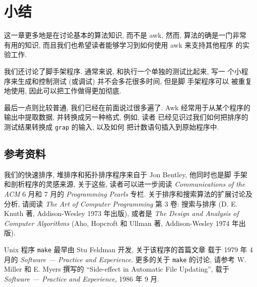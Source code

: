 \section{小结}
\label{sec:experiments_with_algorithms_summary}

这一章更多地是在讨论基本的算法知识, 而不是 awk, 然而, 算法的确是一门非常
有用的知识, 而且我们也希望读者能够学习到如何使用 awk 来支持其他程序
的实验工作.

我们还讨论了脚手架程序. 通常来说, 和执行一个单独的测试比起来, 写一 
个小程序来生成和控制测试 (或调试) 并不会多花很多时间, 但是脚 
手架程序可以 被重复地使用, 因此可以把工作做得更加彻底.

最后一点则比较普通, 我们已经在前面说过很多遍了.
Awk 经常用于从某个程序的输出中提取数据, 并转换成另一种格式, 例如, 读者 
已经见识过我们如何把排序的测试结果转换成 \texttt{grap} 的输入, 以及如何
把计数语句插入到原始程序中.

\subsection*{参考资料}

我们的快速排序, 堆排序和拓扑排序程序来自于 Jon Bentley, 他同时也是脚
手架和剖析程序的灵感来源, 关于这些, 读者可以进一步阅读
\textit{Communications of the ACM} 6 月和 7 月的 
\textit{Programming Pearls} 专栏. 关于排序和搜索算法的扩展讨论及分析,
请阅读 \textit{The Art of Computer Programming} 第 3 卷: 搜索与排序
(D. E. Knuth 著, Addison-Wesley 1973 年出版), 或者是 \textit{The Design and
Analysis of Computer Algorithms} (Aho, Hopcroft 和 Ullman 著, 
Addison-Wesley 1974 年出版).

Unix 程序 \texttt{make} 最早由 Stu Feldman 开发, 关于该程序的首篇文章
载于 1979 年 4 月的 \textit{Software --- Practice and Experience}.
更多的关于 \texttt{make} 的讨论, 请参考 W. Miller 和 E. Myers 撰写的
``Side-effect in Automatic File Updating'', 载于 
\textit{Software --- Practice and Experience}, 1986 年 9 月.
